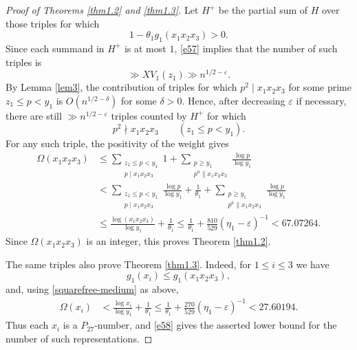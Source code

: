 \documentclass[10pt,a4paper]{amsart}
\numberwithin{equation}{section}
\begin{document}
\begin{proof}[Proof of Theorems \ref{thm1.2} and \ref{thm1.3}]
Let $H^+$ be the partial sum of $H$ over those triples for which
\[
1-\theta_1g_1(x_1x_2x_3)>0.
\]
Since each summand in $H^+$ is at most $1$, \eqref{e57} implies that the number of such triples is
\begin{equation}\label{e58}
\gg XV_1(z_1)\gg n^{1/2-\varepsilon}.
\end{equation}
By Lemma \ref{lem3}, the contribution of triples for which $p^2\mid x_1x_2x_3$ for some prime $z_1\leq p<y_1$ is $O(n^{1/2-\delta})$ for some $\delta>0$. Hence, after decreasing $\varepsilon$ if necessary, there are still $\gg n^{1/2-\varepsilon}$ triples counted by $H^+$ for which
\begin{equation}\label{squarefree-medium}
p^2\nmid x_1x_2x_3\qquad(z_1\leq p<y_1).
\end{equation}
For any such triple, the positivity of the weight gives
\begin{align*}
\Omega(x_1x_2x_3)
&\leq
\sum_{\substack{z_1\leq p<y_1\\ p\mid x_1x_2x_3}}1
+
\sum_{\substack{p\geq y_1\\ p^a\parallel x_1x_2x_3}}\frac{\log p}{\log y_1} \\
&<
\sum_{\substack{z_1\leq p<y_1\\ p\mid x_1x_2x_3}}
\frac{\log p}{\log y_1}
+\frac1{\theta_1}
+
\sum_{\substack{p\geq y_1\\ p^a\parallel x_1x_2x_3}}
\frac{\log p}{\log y_1} \\
&\leq
\frac{\log(x_1x_2x_3)}{\log y_1}+\frac1{\theta_1}
\leq
\frac1{\theta_1}+\frac{810}{529}(\eta_1-\varepsilon)^{-1}
<67.07264.
\end{align*}
Since $\Omega(x_1x_2x_3)$ is an integer, this proves Theorem \ref{thm1.2}.

The same triples also prove Theorem \ref{thm1.3}. Indeed, for $1\leq i\leq3$ we have
\[
g_1(x_i)\leq g_1(x_1x_2x_3),
\]
and, using \eqref{squarefree-medium} as above,
\begin{align*}
\Omega(x_i)
&<
\frac{\log x_i}{\log y_1}+\frac1{\theta_1}
\leq
\frac1{\theta_1}+\frac{270}{529}(\eta_1-\varepsilon)^{-1}
<27.60194.
\end{align*}
Thus each $x_i$ is a $P_{27}$-number, and \eqref{e58} gives the asserted lower bound for the number of such representations.
\end{proof}
\end{document}
